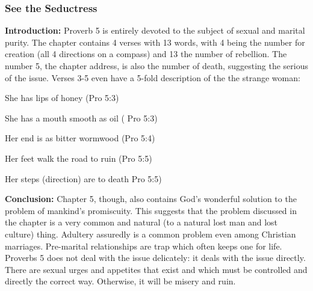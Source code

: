 \subsubsection{See the Seductress}
\textbf{Introduction:} Proverb 5 is entirely devoted to the subject of sexual and marital purity. The chapter contains 4 verses with 13 words, with 4 being the number for creation (all 4 directions on a compass) and 13 the number of rebellion. The number 5, the chapter address, is also the number of death, suggesting the serious of the issue.  Verses 3-5 even have a 5-fold description of the the strange woman:
\begin{compactenum}[I.]
    \item She has lips of honey  (Pro 5:3) 
    \item She has a mouth smooth as oil  ( Pro 5:3)
    \item Her end is as bitter wormwood  (Pro  5:4)
    \item Her feet walk the road to ruin  (Pro 5:5)
    \item Her steps (direction) are to death  Pro 5:5)
\end{compactenum}
\textbf{Conclusion:} Chapter 5, though, also contains God's wonderful solution to the problem of mankind's promiscuity. This suggests that the problem discussed in the chapter is a very common and natural (to a natural lost man and lost culture) thing.  Adultery assuredly is a common problem even among Christian marriages. Pre-marital relationships are trap which often keeps one for life. Proverbs 5 does not deal with the issue delicately: it deals with the issue directly.  There are sexual urges and appetites that exist and which must be controlled and directly the correct way.  Otherwise, it will be misery and ruin.